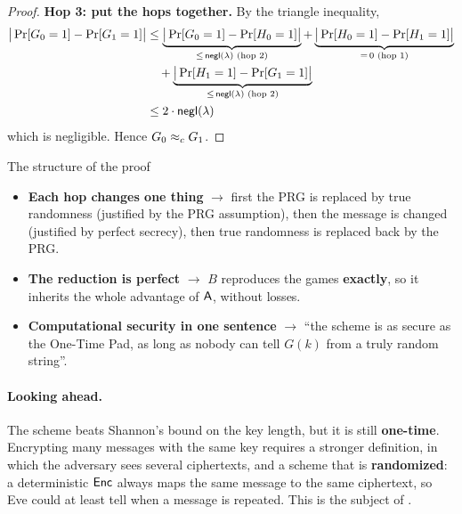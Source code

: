 \begin{proof}
  \medskip
  \textbf{Hop 3: put the hops together.} By the triangle inequality,
  \[
    \begin{aligned}
      \big|\Pr[G_0 = 1] - \Pr[G_1 = 1]\big|
      &\leq \underbrace{\big|\Pr[G_0 = 1] - \Pr[H_0 = 1]\big|}_{\leq\, \mathsf{negl}(\lambda) \text{ (hop 2)}}
      + \underbrace{\big|\Pr[H_0 = 1] - \Pr[H_1 = 1]\big|}_{=\, 0 \text{ (hop 1)}} \\
      &\quad + \underbrace{\big|\Pr[H_1 = 1] - \Pr[G_1 = 1]\big|}_{\leq\, \mathsf{negl}(\lambda) \text{ (hop 2)}} \\
      &\leq 2 \cdot \mathsf{negl}(\lambda)
    \end{aligned}
  \]
  which is negligible. Hence $G_0 \approx_c G_1$.
\end{proof}

\begin{framedobs}{The structure of the proof}
  \begin{itemize}
    \item \textbf{Each hop changes one thing} $\to$ first the PRG is replaced by true randomness (justified by the PRG assumption), then the message is changed (justified by perfect secrecy), then true randomness is replaced back by the PRG.
    \item \textbf{The reduction is perfect} $\to$ $B$ reproduces the games \textbf{exactly}, so it inherits the whole advantage of $\mathsf{A}$, without losses.
    \item \textbf{Computational security in one sentence} $\to$ ``the scheme is as secure as the One-Time Pad, as long as nobody can tell $G(k)$ from a truly random string''.
  \end{itemize}
\end{framedobs}

\paragraph{Looking ahead.} The scheme beats Shannon's bound on the key length, but it is still \textbf{one-time}. Encrypting many messages with the same key requires a stronger definition, in which the adversary sees several ciphertexts, and a scheme that is \textbf{randomized}: a deterministic $\mathsf{Enc}$ always maps the same message to the same ciphertext, so Eve could at least tell when a message is repeated. This is the subject of .
